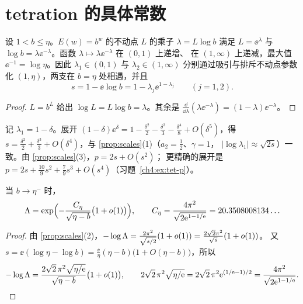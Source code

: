 \section{tetration 的具体常数}\label{ch4:sec:tetration}

\begin{lemma}[乘子参数化]\label{ch4:lem:tet-param}
设 $1<b\le\eta$。$E(w)=b^w$ 的不动点 $L$ 的乘子 $\lambda=L\log b$ 满足
$L=\ee^\lambda$ 与 $\log b=\lambda\ee^{-\lambda}$。函数 $\lambda\mapsto\lambda\ee^{-\lambda}$ 在 $(0,1)$ 上递增、
在 $(1,\infty)$ 上递减，最大值 $\ee^{-1}=\log\eta$。因此 $\lambda_1\in(0,1)$ 与 $\lambda_2\in(1,\infty)$
分别通过吸引与排斥不动点参数化 $(1,\eta)$，两支在 $b=\eta$ 处相遇，并且
\[
 s=1-\ee\log b=1-\lambda_j\ee^{1-\lambda_j}\qquad(j=1,2).
\]
\end{lemma}

\begin{proof}
$L=b^L$ 给出 $\log L=L\log b=\lambda$。其余是 $\frac{\dd}{\dd\lambda}(\lambda\ee^{-\lambda})=(1-\lambda)\ee^{-\lambda}$。
\end{proof}

记 $\lambda_1=1-\delta$。展开 $(1-\delta)\ee^\delta=1-\frac{\delta^2}2-\frac{\delta^3}3-\frac{\delta^4}8+O(\delta^5)$，得
$s=\frac{\delta^2}2+\frac{\delta^3}3+O(\delta^4)$，与 \cref{prop:scales}(1)（$a_2=\frac12$、$\gamma=1$，
$|\log\lambda_1|\approx\sqrt{2s}$）一致。由 \cref{prop:scales}(3)，$p=2s+O(s^2)$；
更精确的展开是 $p=2s+\frac{10}9s^2+\frac79s^3+O(s^4)$（习题~\ref{ch4:ex:tet-p}）。

\begin{corollary}\label{ch4:cor:ceta}
当 $b\to\eta^-$ 时，
\[
 \Lambda=\exp\Bigl(-\frac{C_\eta}{\sqrt{\eta-b}}\bigl(1+o(1)\bigr)\Bigr),\qquad
 C_\eta=\frac{4\pi^2}{\sqrt{2\mathrm{e}^{1-1/\mathrm{e}}}}=20.3508008134\ldots
\]
\end{corollary}

\begin{proof}
由 \cref{prop:scales}(2)，$-\log\Lambda=\frac{2\pi^2}{\sqrt{s/2}}(1+o(1))=\frac{2\sqrt2\pi^2}{\sqrt s}(1+o(1))$。
又 $s=\ee(\log\eta-\log b)=\frac{\ee}{\eta}(\eta-b)\bigl(1+O(\eta-b)\bigr)$，所以
\[
 -\log\Lambda=\frac{2\sqrt2\,\pi^2\sqrt{\eta/\mathrm{e}}}{\sqrt{\eta-b}}\bigl(1+o(1)\bigr),\qquad
 2\sqrt2\,\pi^2\sqrt{\eta/\mathrm{e}}=2\sqrt2\,\pi^2\mathrm{e}^{(1/\mathrm{e}-1)/2}=\frac{4\pi^2}{\sqrt{2\mathrm{e}^{1-1/\mathrm{e}}}} .\qedhere
\]
\end{proof}

